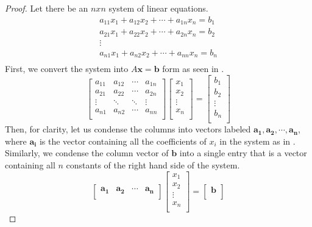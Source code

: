 \documentclass[11pt,reqno]{amsart}
\theoremstyle{definition}
\begin{document}
\begin{proof} Let there be an $nxn$ system of linear equations.
\begin{align*}
a_{11}x_1 + a_{12}x_2 + \cdots + a_{1n}x_n = b_1\\
a_{21}x_1 + a_{22}x_2 + \cdots + a_{2n}x_n = b_2\\
\vdots\\
a_{n1}x_1 + a_{n2}x_2 + \cdots + a_{nn}x_n = b_n\\
\end{align*}
First, we convert the system into $A\mathbf{x}=\mathbf{b}$ form as seen in \cite[Chapters 1.3 and 2.1]{strang}.
$$
\begin{bmatrix}
    a_{11} & a_{12} & \cdots & a_{1n}\\
    a_{21} & a_{22} & \cdots & a_{2n}\\
    \vdots & \ddots & \ddots & \vdots\\
    a_{n1} & a_{n2} & \cdots & a_{nn}\\
\end{bmatrix}
\begin{bmatrix}
    x_{1}\\
    x_{2}\\
    \vdots\\
    x_{n}\\
\end{bmatrix}
= 
\begin{bmatrix}
    b_{1}\\
    b_{2}\\
    \vdots\\
    b_{n}\\
\end{bmatrix}
$$
Then, for clarity, let us condense the columns into vectors labeled $\mathbf{a_1}, \mathbf{a_2}, \cdots,\mathbf{a_n}$, where $\mathbf{a_i}$ is the vector containing all the coefficients of $x_i$ in the system as in \cite[Chapter 1.1]{strang}. Similarly, we condense the column vector of $\mathbf{b}$ into a single entry that is a vector containing all $n$ constants of the right hand side of the system.
$$
\begin{bmatrix}
    \mathbf{a_1} & \mathbf{a_2} & \cdots& \mathbf{a_n}\\
\end{bmatrix}
\begin{bmatrix}
    x_{1}\\
    x_{2}\\
    \vdots\\
    x_{n}\\
\end{bmatrix}
= 
\begin{bmatrix}
    \mathbf{b}\\
\end{bmatrix}
$$


\end{proof}
\end{document}
